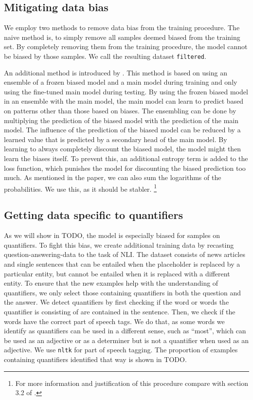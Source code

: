 \subsection{Mitigating data bias}\label{par:method:mitigating_data_bias}

We employ two methods to remove data bias from the training procedure. The naive method is, to simply remove all samples deemed biased from the training set. By completely removing them from the training procedure, the model cannot be biased by those samples. We call the resulting dataset \texttt{filtered}.

An additional method is introduced by \citet{ensemble}. This method is based on using an ensemble of a frozen biased model and a main model during training and only using the fine-tuned main model during testing. By using the frozen biased model in an ensemble with the main model, the main model can learn to predict based on patterns other than those based on biases. The ensembling can be done by multiplying the prediction of the biased model with the prediction of the main model. The influence of the prediction of the biased model can be reduced by a learned value that is predicted by a secondary head of the main model. By learning to always completely discount the biased model, the model might then learn the biases itself. To prevent this, an additional entropy term is added to the loss function, which punishes the model for discounting the biased prediction too much. As mentioned in the paper, we can also sum the logarithms of the probabilities. We use this, as it should be stabler. \footnote{For more information and justification of this procedure compare with section 3.2 of \cite{ensemble}.}

\subsection{Getting data specific to quantifiers} \label{sec:meth:recasting}

As we will show in TODO, the model is especially biased for samples on quantifiers. To fight this bias, we create additional training data by recasting question-answering-data to the task of \ac{NLI}. The dataset consists of news articles and single sentences that can be entailed when the placeholder is replaced by a particular entity, but cannot be entailed when it is replaced with a different entity. To ensure that the new examples help with the understanding of quantifiers, we only select those containing quantifiers in both the question and the answer. We detect quantifiers by first checking if the word or words the quantifier is consisting of are contained in the sentence. Then, we check if the words have the correct part of speech tags. We do that, as some words we identify as quantifiers can be used in a different sense, such as \enquote{most}, which can be used as an adjective or as a determiner but is not a quantifier when used as an adjective. We use \texttt{nltk} \cite{nltk} for part of speech tagging. The proportion of examples containing quantifiers identified that way is shown in TODO.


